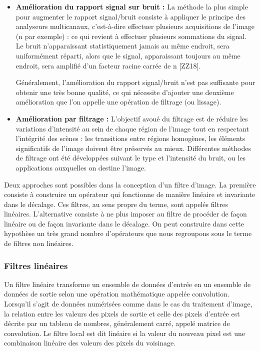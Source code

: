 \begin{itemize}
	\item \textbf{Amélioration du rapport signal sur bruit :} La méthode la plus simple pour augmenter le rapport signal/bruit consiste à appliquer le principe des analyseurs multicanaux, c'est-à-dire effectuer plusieurs acquisitions de l’image (n par exemple) : ce qui revient à effectuer plusieurs sommations du signal. Le bruit n’apparaissant statistiquement jamais au même endroit, sera uniformément réparti, alors que le signal, apparaissant toujours au même endroit, sera amplifié d’un facteur racine carrée de n [ZZ18].
	
	Généralement, l'amélioration du rapport signal/bruit n’est pas suffisante pour obtenir une très bonne qualité, ce qui nécessite d’ajouter une deuxième amélioration que l’on appelle une opération de filtrage (ou lissage).
	
	\item \textbf{Amélioration par filtrage :}
	L'objectif avoué du filtrage est de réduire les variations d'intensité au sein de chaque région de l'image tout en respectant l'intégrité des scènes :
	les transitions entre régions homogènes, les éléments significatifs de l'image	doivent être préservés au mieux. Différentes méthodes de filtrage ont été développées suivant le type et l’intensité du bruit, ou les applications auxquelles on destine l'image.\\
	
\end{itemize}

Deux approches sont possibles dans la conception d’un filtre d’image.
La première consiste à construire un opérateur qui fonctionne de manière
linéaire et invariante dans le décalage. Ces filtres, au sens propre du terme, sont appelés filtres linéaires. L'alternative consiste à ne plus imposer au filtre de procéder de façon linéaire ou de façon invariante dans le décalage. On peut construire dans cette hypothèse un très grand nombre d’opérateurs que nous regroupons sous le terme de filtres non linéaires.

\subsubsection{Filtres linéaires}
Un filtre linéaire transforme un ensemble de données d'entrée en un
ensemble de données de sortie selon une opération mathématique appelée
convolution. Lorsqu'il s'agit de données numérisées comme dans le cas du
traitement d'image, la relation entre les valeurs des pixels de sortie et celle des pixels d'entrée est décrite par un tableau de nombres, généralement carré, appelé matrice de convolution. Le filtre local est dit linéaire si la valeur du nouveau pixel est une combinaison linéaire des valeurs des pixels du voisinage.

